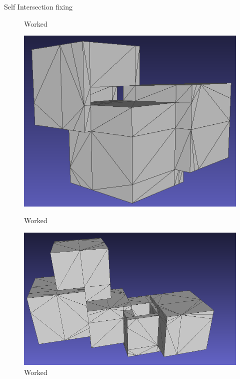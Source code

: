 \documentclass[10pt]{beamer}
\begin{document}
\begin{frame}{Self Intersection fixing}
\begin{figure}
\begin{minipage}[b]{0.23\textwidth}
          \caption{Worked}
        \end{minipage}\hfill
        \begin{minipage}[b]{0.23\textwidth}
          \centering
          \includegraphics[width=\textwidth]{../image/3cubesksr.png}
          \caption{Worked}
        \end{minipage}\hfill
        \begin{minipage}[b]{0.23\textwidth}
          \centering
          \includegraphics[width=\textwidth]{../image/5cubeoutcome.png}
          \caption{Worked}
        \end{minipage}
      \end{figure}
\end{frame}
\end{document}
